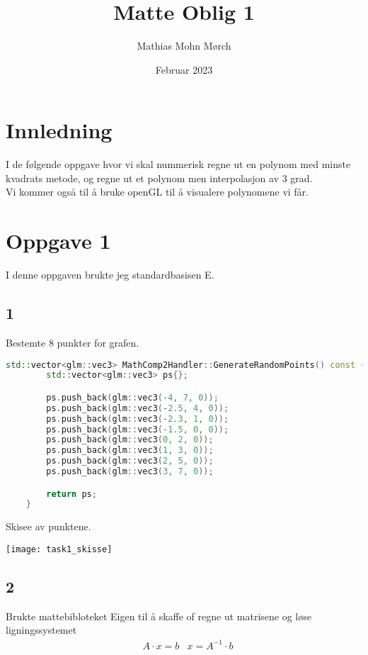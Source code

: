 ﻿\documentclass[14]{article}
\title{Matte Oblig 1}
\author{Mathias Mohn Mørch}
\date{Februar 2023}
\begin{document}
    \maketitle
    \begin{flushleft}
        \graphicspath{{Images/}}

        \section{Innledning}
        I de følgende oppgave hvor vi skal nummerisk regne ut en polynom med minste kvadrats metode, 
        og regne ut et polynom men interpolasjon av 3 grad. \\
        Vi kommer også til å bruke openGL til å visualere polynomene vi får.
        

        \section{Oppgave 1}
        I denne oppgaven brukte jeg standardbasisen E.
        
        \subsection*{1}
        Bestemte 8 punkter for grafen.

        \begin{lstlisting}[language=C++, caption=C++ example]
    std::vector<glm::vec3> MathComp2Handler::GenerateRandomPoints() const {
        std::vector<glm::vec3> ps{};

        ps.push_back(glm::vec3(-4, 7, 0));
        ps.push_back(glm::vec3(-2.5, 4, 0));
        ps.push_back(glm::vec3(-2.3, 1, 0));
        ps.push_back(glm::vec3(-1.5, 0, 0));
        ps.push_back(glm::vec3(0, 2, 0));
        ps.push_back(glm::vec3(1, 3, 0));
        ps.push_back(glm::vec3(2, 5, 0));
        ps.push_back(glm::vec3(3, 7, 0));

        return ps;
    }
        \end{lstlisting}
        
        Skisee av punktene.

        \texttt{[image: task1\_skisse]}
        
        
        
        \subsection*{2}
        Brukte mattebibloteket Eigen til å skaffe of regne ut matrisene og løse ligningssystemet 
        \begin{align*}
            & A\cdot x = b
            & x = A^{-1} \cdot b
        \end{align*}
        

\end{flushleft}
\end{document}
